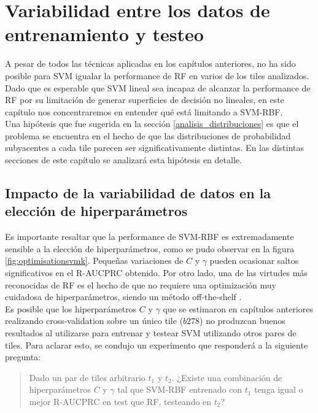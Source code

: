 \chapter{Variabilidad entre los datos de entrenamiento y testeo}
\label{variabilidad}
A pesar de todos las técnicas aplicadas en los capítulos anteriores, no ha sido posible para SVM igualar la performance de RF en varios de los tiles analizados. Dado que es esperable que SVM lineal sea incapaz de alcanzar la performance de RF por su limitación de generar superficies de decisión no lineales, en este capítulo nos concentraremos en entender qué está limitando a SVM-RBF. \\

Una hipótesis que fue sugerida en la sección \ref{analisis_distribuciones} es que el problema se encuentra en el hecho de que las distribuciones de probabilidad subyacentes a cada tile parecen ser significativamente distintas. En las distintas secciones de este capítulo se analizará esta hipótesis en detalle.

\section{Impacto de la variabilidad de datos en la elección de hiperparámetros }
\label{impacto}
Es importante resaltar que la performance de SVM-RBF es extremadamente sensible a la elección de hiperparámetros, como se pudo observar en la figura \ref{fig:optimisationsvmk}. Pequeñas variaciones de $C$ y $\gamma$ pueden ocasionar saltos significativos en el R-AUCPRC obtenido. Por otro lado, una de las virtudes más reconocidas de RF es el hecho de que no requiere una optimización muy cuidadosa de hiperparámetros, siendo un método off-the-shelf \cite{offshelf}. \\

Es posible que los hiperparámetros $C$ y $\gamma$ que se estimaron en capítulos anteriores realizando cross-validation sobre un único tile ($b278$) no produzcan buenos resultados al utilizarse para entrenar y testear SVM utilizando otros pares de tiles. Para aclarar esto, se condujo un experimento que responderá a la siguiente pregunta:

\begin{quotation}
Dado un par de tiles arbitrario $t_1$ y $t_2$. ¿Existe una combinación de hiperparámetros $C$ y $\gamma$ tal que SVM-RBF entrenado con $t_1$ tenga igual o mejor R-AUCPRC en test que RF, testeando en $t_2$?
\end{quotation}

